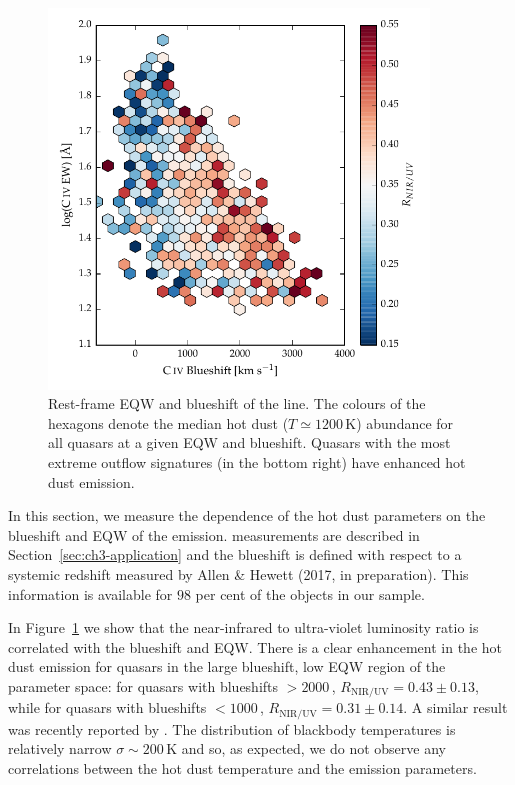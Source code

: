 \begin{figure}[t!]
\centering
  \includegraphics[width=0.9\textwidth]{figures/chapter05/hot_dust_ratio.pdf}
\caption[{Hot dust abundance as a function of rest-frame EQW and blueshift of the  line.}]{Rest-frame EQW and blueshift of the  line. The colours of the hexagons denote the median hot dust ($T\simeq1200$\,K) abundance for all quasars at a given EQW and blueshift. Quasars with the most extreme outflow signatures (in the bottom right) have enhanced hot dust emission.}
  \label{fig:civ_hot_dust}
\end{figure}

In this section, we measure the dependence of the hot dust parameters on the blueshift and EQW of the  emission. 
 measurements are described in Section~\ref{sec:ch3-application} and the  blueshift is defined with respect to a systemic redshift measured by Allen \& Hewett (2017, in preparation). 
This information is available for $98$ per cent of the objects in our sample. 

In Figure~\ref{fig:civ_hot_dust} we show that the near-infrared to ultra-violet luminosity ratio is correlated with the  blueshift and EQW. 
There is a clear enhancement in the hot dust emission for quasars in the large  blueshift, low EQW region of the parameter space: for quasars with  blueshifts $>2000$\,\kms, $R_{\text{NIR/UV}}=0.43\pm0.13$, while for quasars with  blueshifts $<1000$\,\kms, $R_{\text{NIR/UV}}=0.31\pm0.14$.
A similar result was recently reported by \citet{wang13}. 
The distribution of blackbody temperatures is relatively narrow $\sigma\sim200$\,K and so, as expected, we do not observe any correlations between the hot dust temperature and the  emission parameters. 

